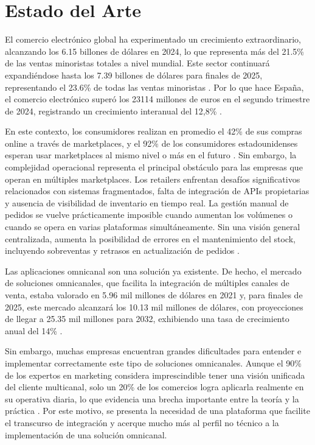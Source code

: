 \section{Estado del Arte}
\label{intro:sec:estado_arte}

El comercio electrónico global ha experimentado un crecimiento extraordinario, alcanzando los 6.15 billones de dólares en 2024, lo que representa más del 21.5\% de las ventas minoristas totales a nivel mundial. Este sector continuará expandiéndose hasta los 7.39 billones de dólares para finales de 2025, representando el 23.6\% de todas las ventas minoristas \cite{ea_bluehost}. Por lo que hace España, el comercio electrónico superó los 23114 millones de euros en el segundo trimestre de 2024, registrando un crecimiento interanual del 12,8\% \cite{ea_cnmc}.

En este contexto, los consumidores realizan en promedio el 42\% de sus compras online a través de marketplaces, y el 92\% de los consumidores estadounidenses esperan usar marketplaces al mismo nivel o más en el futuro \cite{ea_future}. Sin embargo, la complejidad operacional representa el principal obstáculo para las empresas que operan en múltiples marketplaces. Los retailers enfrentan desafíos significativos relacionados con sistemas fragmentados, falta de integración de APIs propietarias y ausencia de visibilidad de inventario en tiempo real. La gestión manual de pedidos se vuelve prácticamente imposible cuando aumentan los volúmenes o cuando se opera en varias plataformas simultáneamente. Sin una visión general centralizada, aumenta la posibilidad de errores en el mantenimiento del stock, incluyendo sobreventas y retrasos en actualización de pedidos \cite{ea_volo}.

Las aplicaciones omnicanal son una solución ya existente. De hecho, el mercado de soluciones omnicanales, que facilita la integración de múltiples canales de venta, estaba valorado en 5.96 mil millones de dólares en 2021 y, para finales de 2025, este mercado alcanzará los 10.13 mil millones de dólares, con proyecciones de llegar a 25.35 mil millones para 2032, exhibiendo una tasa de crecimiento anual del 14\% \cite{ea_grandview}\cite{ea_coherent}.

Sin embargo, muchas empresas encuentran grandes dificultades para entender e implementar correctamente este tipo de soluciones omnicanales. Aunque el 90\% de los expertos en marketing considera imprescindible tener una visión unificada del cliente multicanal, solo un 20\% de los comercios logra aplicarla realmente en su operativa diaria, lo que evidencia una brecha importante entre la teoría y la práctica \cite{ea_adyen}. Por este motivo, se presenta la necesidad de una plataforma que facilite el transcurso de integración y acerque mucho más al perfil no técnico a la implementación de una solución omnicanal.